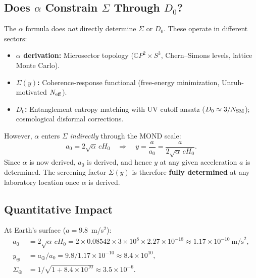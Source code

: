 \documentclass[11pt]{article}
\theoremstyle{definition}
\theoremstyle{remark}
\begin{document}
\subsection{Does $\alpha$ Constrain $\Sigma$ Through $D_0$?}

\begin{tcolorbox}[colback=yellow!5!white, colframe=yellow!60!black,
  title={Answer: Indirectly Yes, Through the MOND Scale}]
The $\alpha$ formula does \emph{not} directly determine $\Sigma$ or $D_0$.
These operate in different sectors:

\begin{itemize}
\item \textbf{$\alpha$ derivation:} Microsector topology
  ($\mathbb{C}P^2 \times S^3$, Chern--Simons levels, lattice Monte Carlo).
\item \textbf{$\Sigma(y)$:} Coherence-response functional
  (free-energy minimization, Unruh-motivated $N_{\rm eff}$).
\item \textbf{$D_0$:} Entanglement entropy matching with UV cutoff ansatz
  ($D_0 \approx 3/N_{\rm SM}$); cosmological disformal corrections.
\end{itemize}

However, $\alpha$ enters $\Sigma$ \emph{indirectly} through the MOND scale:
\begin{equation}
a_0 = 2\sqrt{\alpha}\,cH_0 \quad\Rightarrow\quad
y = \frac{a}{a_0} = \frac{a}{2\sqrt{\alpha}\,cH_0}.
\end{equation}
Since $\alpha$ is now derived, $a_0$ is derived, and hence $y$ at any
given acceleration $a$ is determined. The screening factor $\Sigma(y)$ is
therefore \textbf{fully determined} at any laboratory location once $\alpha$
is derived.
\end{tcolorbox}

\subsection{Quantitative Impact}

At Earth's surface ($a = 9.8$~m/s$^2$):
\begin{align}
a_0 &= 2\sqrt{\alpha}\,cH_0
    = 2 \times 0.08542 \times 3 \times 10^8 \times 2.27 \times 10^{-18}
    \approx 1.17 \times 10^{-10}~\text{m/s}^2, \\
y_\oplus &= a_\oplus / a_0 = 9.8 / 1.17 \times 10^{-10}
         \approx 8.4 \times 10^{10}, \\
\Sigma_\oplus &= 1/\sqrt{1 + 8.4 \times 10^{10}}
              \approx 3.5 \times 10^{-6}.
\end{align}
\end{document}

